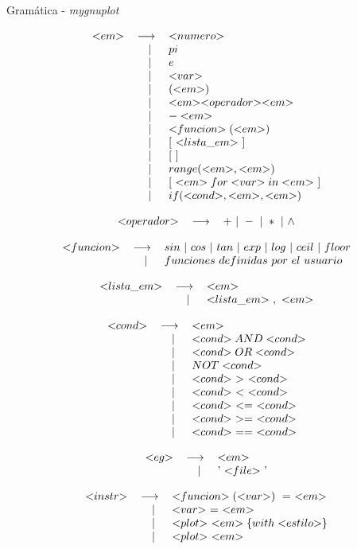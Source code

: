 \documentclass[a4paper,12pt, notitlepage, fleqn]{article}
\newcommand{\va}{\longrightarrow}
\newcommand{\bpr}[1]{\begin{gather*}\begin{tabular}{crl}#1\end{tabular}\end{gather*}}
\newcommand{\lpr}[2]{$#1$ & $\va$ & $#2$\\}
\newcommand{\lpror}[1]{ & $|\ $ & $#1$\\}
\newcommand{\var}[1]{<\hspace{-0.1cm}#1\hspace{-0.1cm}>}
\begin{document}
\pagestyle{empty}
\thispagestyle{empty}

\begin{center}
\Large{Gramática - \textit{mygnuplot}}
\end{center}

\bpr{
\lpr{\var{em}}{\var{numero}}
\lpror{pi}
\lpror{e}
\lpror{\var{var}}
\lpror{(\var{em})}
\lpror{\var{em}\var{operador}\var{em}}
\lpror{-\var{em}}
\lpror{\var{funcion}(\var{em})}
\lpror{[\ \var{lista\_em}\ ]}
\lpror{[\ ]}
\lpror{range(\var{em},\var{em})}
\lpror{[\ \var{em} for \var{var} in \var{em}\ ]}
\lpror{if (\var{cond}, \var{em}, \var{em})}
}

\bpr{
\lpr{\var{operador}}{+\ |\ -\ |\ *\ |\ \wedge}
}

\bpr{
\lpr{\var{funcion}}{sin\ |\ cos\ |\ tan\ |\ exp\ |\ log\ |\ ceil\ |\ floor}
\lpror{funciones\ definidas\ por\ el\ usuario}
}

\bpr{
\lpr{\var{lista\_em}}{\var{em}}
\lpror{\var{lista\_em}\ ,\ \var{em}}
}

\bpr{
\lpr{\var{cond}}{\var{em}}
\lpror{\var{cond} AND \var{cond}}
\lpror{\var{cond} OR \var{cond}}
\lpror{NOT \var{cond}}
\lpror{\var{cond}\ > \ \var{cond}}
\lpror{\var{cond}\ < \ \var{cond}}
\lpror{\var{cond}\ <=\ \var{cond}}
\lpror{\var{cond}\ >=\ \var{cond}}
\lpror{\var{cond}\ ==\ \var{cond}}
}

\bpr{
\lpr{\var{eg}}{{\var{em}}}
\lpror{$'$\ \var{file}\ $'$}
}

\bpr{
\lpr{\var{instr}}{\var{funcion}(\var{var})\ =\ \var{em}}
\lpror{\var{var}\ =\ \var{em}}
\lpror{\var{plot}\ \var{em} \lbrace with \var{estilo}\rbrace}
\lpror{\var{plot}\ \var{em}}
}
\end{document}
